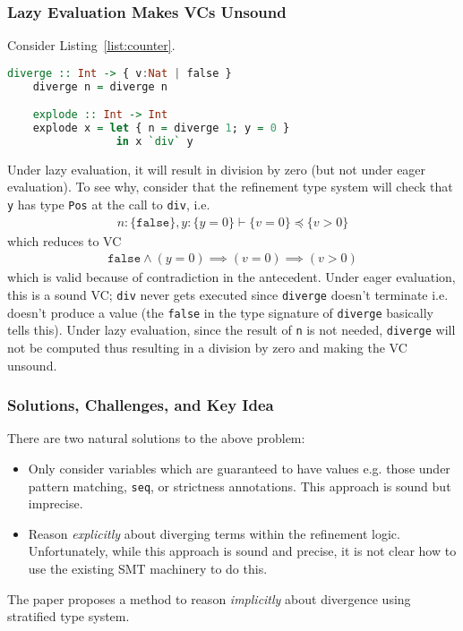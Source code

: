 \documentclass[a4paper,UKenglish]{lipics-v2016}
\begin{document}
\subsubsection{Lazy Evaluation Makes VCs Unsound}
Consider Listing~\ref{list:counter}.  
\begin{lstlisting}[caption={Lazy evaluation breaks VC},float,captionpos=t,label={list:counter},language=haskell,abovecaptionskip=-\medskipamount]
    diverge :: Int -> { v:Nat | false } 
    diverge n = diverge n

    explode :: Int -> Int
    explode x = let { n = diverge 1; y = 0 }
                 in x `div` y
\end{lstlisting}
Under lazy evaluation, it will result in division by zero (but not under eager
evaluation).  To see why, consider that the refinement type system will check
that \texttt{y} has type \texttt{Pos} at the call to \texttt{div}, i.e.
\begin{align*}
    n:\{\mathtt{false}\},y:\{y=0\}\vdash\{v=0\}\preceq\{v>0\}
\end{align*}
which reduces to VC
\begin{align*}
    \mathtt{false}\wedge(y=0)\implies(v=0)\implies(v>0)
\end{align*}
which is valid because of contradiction in the antecedent.  Under eager
evaluation, this is a sound VC; \texttt{div} never gets executed since
\texttt{diverge} doesn't terminate i.e. doesn't produce a value (the
\texttt{false} in the type signature of \texttt{diverge} basically tells this).
Under lazy evaluation, since the result of \texttt{n} is not needed,
\texttt{diverge} will not be computed thus resulting in a division by zero and
making the VC unsound.

\subsubsection{Solutions, Challenges, and Key Idea}
There are two natural solutions to the above problem:
\begin{itemize}
    \item Only consider variables which are guaranteed to have values e.g.
        those under pattern matching, \texttt{seq}, or strictness annotations.
        This approach is sound but imprecise.
    \item Reason \emph{explicitly} about diverging terms within the refinement
        logic.  Unfortunately, while this approach is sound and precise, it is
        not clear how to use the existing SMT machinery to do this.
\end{itemize}
The paper proposes a method to reason \emph{implicitly} about divergence using
stratified type system.
\end{document}
